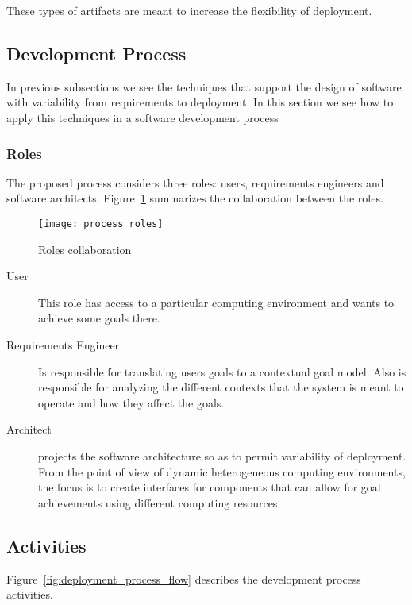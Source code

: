 These types of artifacts are meant to increase the flexibility of deployment.


\subsection{Development Process}

In previous subsections we see the techniques that support the design of software with variability from requirements to deployment. In this section we see how to apply this techniques in a software development process

\subsubsection{Roles}
The proposed process considers three roles: users, requirements engineers and software architects.
Figure~\ref{fig:process_roles} summarizes the collaboration between the roles.

 \begin{figure}[!htb]
   \centering
   \texttt{[image: process\_roles]}
   \caption{Roles collaboration}
 \label{fig:process_roles}
 \end{figure}

\begin{description}
  \item[User]
  This role has access to a particular computing environment and wants to achieve some goals there.
  \item[Requirements Engineer]
  Is responsible for translating users goals to a contextual goal model. Also is responsible for analyzing the different contexts that the system is meant to operate and how they affect the goals.
  \item[Architect] projects the software architecture so as to permit variability of deployment.
  From the point of view of dynamic heterogeneous computing environments, the focus is to create interfaces for components that can allow for goal achievements using different computing resources.

\end{description}



\subsection{Activities}

Figure~\ref{fig:deployment_process_flow} describes the development process activities.

